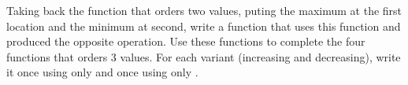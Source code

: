 


Taking back the function  that orders two values,
puting the maximum at the first location and the minimum at second, 
write a function  that uses this function and
produced the opposite operation. Use these functions to complete the
four functions that orders 3 values. For each variant (increasing and
decreasing), write it once using only  and once
using only .



